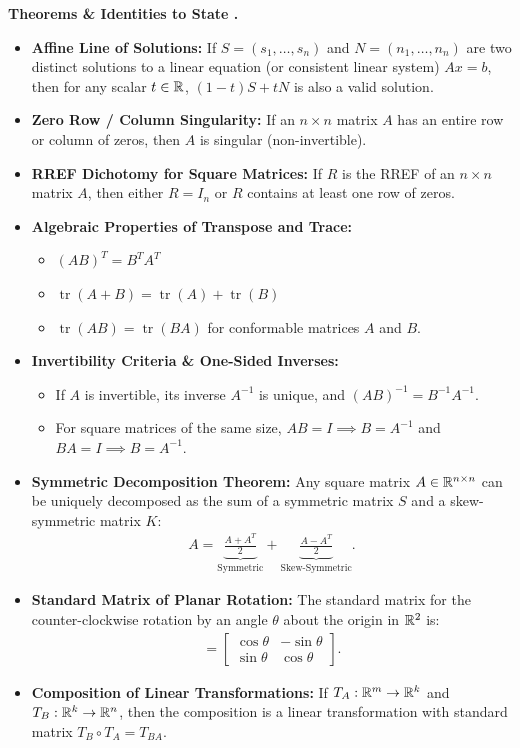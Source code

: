 \documentclass{natsirt}
\newcounter{topic}[section]
\newenvironment{theoremsbox}[1][]{%
    \begin{greenbox}[#1]\refstepcounter{topic}\textbf{Theorems \& Identities to State \thesection.\thetopic}%
}{\end{greenbox}}
\newcommand{\citem}{\item[$\square$]}
\newcommand{\tr}{\operatorname{tr}}
\begin{document}
\begin{theoremsbox}
    \begin{itemize}
        \citem \textbf{Affine Line of Solutions:} If $S = (s_1, \dots, s_n)$ and $N = (n_1, \dots, n_n)$ are two distinct solutions to a linear equation (or consistent linear system) $Ax = b$, then for any scalar $t \in \mathbb{R}$, $(1-t)S + tN$ is also a valid solution.
        \citem \textbf{Zero Row / Column Singularity:} If an $n \times n$ matrix $A$ has an entire row or column of zeros, then $A$ is singular (non-invertible).
        \citem \textbf{RREF Dichotomy for Square Matrices:} If $R$ is the RREF of an $n \times n$ matrix $A$, then either $R = I_n$ or $R$ contains at least one row of zeros.
        \citem \textbf{Algebraic Properties of Transpose and Trace:}
        \begin{itemize}
            \item $(AB)^T = B^T A^T$
            \item $\tr(A + B) = \tr(A) + \tr(B)$
            \item $\tr(AB) = \tr(BA)$ for conformable matrices $A$ and $B$.
        \end{itemize}
        \citem \textbf{Invertibility Criteria \& One-Sided Inverses:}
        \begin{itemize}
            \item If $A$ is invertible, its inverse $A^{-1}$ is unique, and $(AB)^{-1} = B^{-1} A^{-1}$.
            \item For square matrices of the same size, $AB = I \implies B = A^{-1}$ and $BA = I \implies B = A^{-1}$.
        \end{itemize}
        \citem \textbf{Symmetric Decomposition Theorem:} Any square matrix $A \in \mathbb{R}^{n \times n}$ can be uniquely decomposed as the sum of a symmetric matrix $S$ and a skew-symmetric matrix $K$:
        \begin{align*}
            A = \underbrace{\frac{A + A^T}{2}}_{\text{Symmetric}} + \underbrace{\frac{A - A^T}{2}}_{\text{Skew-Symmetric}}.
        \end{align*}
        \citem \textbf{Standard Matrix of Planar Rotation:} The standard matrix for the counter-clockwise rotation by an angle $\theta$ about the origin in $\mathbb{R}^2$ is:
        \begin{align*}
            [T] = \begin{bmatrix} \cos\theta & -\sin\theta \\ \sin\theta & \cos\theta \end{bmatrix}.
        \end{align*}
        \citem \textbf{Composition of Linear Transformations:} If $T_A: \mathbb{R}^m \to \mathbb{R}^k$ and $T_B: \mathbb{R}^k \to \mathbb{R}^n$, then the composition is a linear transformation with standard matrix $T_B \circ T_A = T_{BA}$.
    \end{itemize}
\end{theoremsbox}
\end{document}
